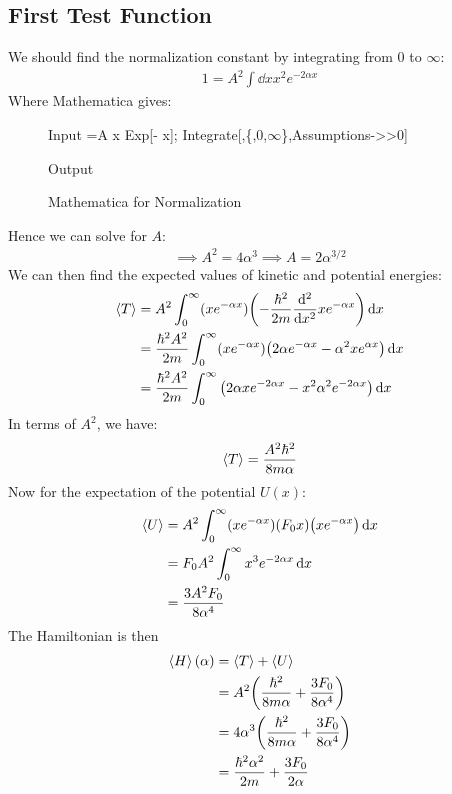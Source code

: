 \documentclass[12pt]{article}
\begin{document}
\subsection{First Test Function}
We should find the normalization constant by integrating from $0$ to $\infty$:
\begin{align*}
  1=A^2\int\dd{x}x^2e^{-2\alpha x}
\end{align*}
Where Mathematica gives:
\begin{figure}[H]
  \centering
\begin{mmaCell}[addtoindex=5]{Input}
  \mmaDef{\(\pmb{\psi}\)}=A x Exp[-\mmaUnd{\(\pmb{\alpha}\)} x];
  Integrate[,\{,0,\(\infty\)\},Assumptions->\mmaUnd{\(\pmb{\alpha}\)}>0]
  
\end{mmaCell}

\begin{mmaCell}[addtoindex=1]{Output}
\end{mmaCell}
  \caption{Mathematica for Normalization}
\end{figure}
Hence we can solve for $A$:
\begin{align*}
  \implies A^2=4\alpha^3\implies A=2\alpha^{3/2}
\end{align*}
We can then find the expected values of kinetic and potential energies:
\begin{align*}
  \ev{T}&=A^2\int_0^\infty(xe^{-\alpha x})
  \qty(-\frac{\hbar^2}{2m}\dv[2]{x}xe^{-\alpha x})\dd{x}\\
  &=\frac{\hbar^2A^2}{2m}\int_0^\infty(xe^{-\alpha x})
  \qty(2\alpha e^{-\alpha x}-\alpha^2xe^{\alpha x})\dd{x}\\
  &=\frac{\hbar^2A^2}{2m}\int_0^\infty
  \qty(2\alpha xe^{-2\alpha x}-x^2\alpha^2e^{-2\alpha x})\dd{x}
\end{align*}
In terms of $A^2$, we have:
\begin{align*}
  \ev{T}=\frac{A^2\hbar^2}{8m\alpha}
\end{align*}
Now for the expectation of the potential $U(x)$:
\begin{align*}
  \ev{U}&=A^2\int_0^\infty(xe^{-\alpha x})\qty(F_0x)\qty(xe^{-\alpha x})\dd{x}\\
  &=F_0A^2\int_0^\infty x^3e^{-2\alpha x}\dd{x}\\
  &=\frac{3A^2F_0}{8\alpha^4}
\end{align*}
The Hamiltonian is then
\begin{align*}
  \ev{H}(\alpha)&=\ev{T}+\ev{U}\\
  &=A^2\qty(\frac{\hbar^2}{8m\alpha}+\frac{3F_0}{8\alpha^4})\\
  &=4\alpha^3\qty(\frac{\hbar^2}{8m\alpha}+\frac{3F_0}{8\alpha^4})\\
  &=\frac{\hbar^2\alpha^2}{2m}+\frac{3F_0}{2\alpha}
\end{align*}
\end{document}
